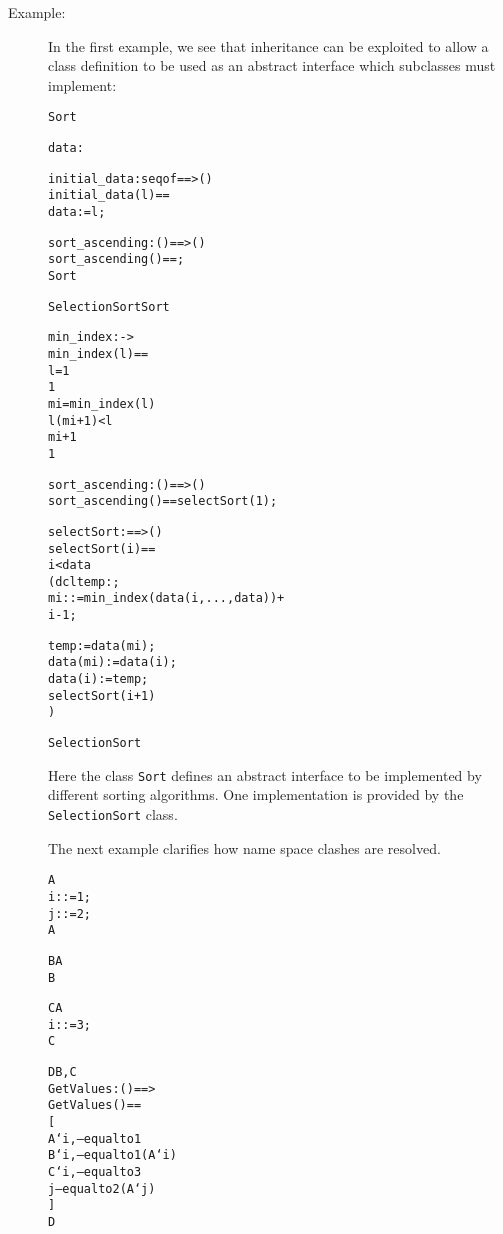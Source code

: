 \documentclass[\pformat,12pt]{article}
\begin{document}
\begin{description}
\item[Example:] In the first example, we see that inheritance can be
exploited to allow a class definition to be used as an abstract
interface which subclasses must implement:
  \begin{alltt}
   Sort

      \PROTECTED data : 


      initial_data : seq of  ==> ()
      initial_data (l) == 
        data := l;

      sort_ascending : () ==> ()
      sort_ascending () == ;
     Sort

   SelectionSort  Sort


      min_index :  -> 
      min_index(l) ==
         l = 1
         1
         mi = min_index( l)
               l(mi+1) <  l
                mi+1
                1


      sort_ascending : () ==> ()
      sort_ascending () == selectSort(1);

      selectSort :  ==> ()
      selectSort (i) ==
         i <  data
         (dcl temp: ;
               mi:  := min_index(data(i,..., data)) + 
                            i - 1;
         
             temp := data(mi);
             data(mi) := data(i);
             data(i) := temp;
             selectSort(i+1)
             )

   SelectionSort
\end{alltt}
Here the class \texttt{Sort} defines an abstract interface to be
implemented by different sorting algorithms. One implementation is
provided by the \texttt{Selecti\-onSort} class. 

The next example clarifies how name space clashes are resolved.
  \begin{alltt}
     A
        i:  := 1;
        j:  := 2;
     A

     B  A
     B

     C  A
        i:  := 3;
     C

     D  B,C
        GetValues: () ==> 
        GetValues() ==
           [
            A`i, -- equal to 1
            B`i, -- equal to 1 (A`i)
            C`i, -- equal to 3
            j   -- equal to 2 (A`j)
          ]
      D
  \end{alltt}
\end{description}
\end{document}
